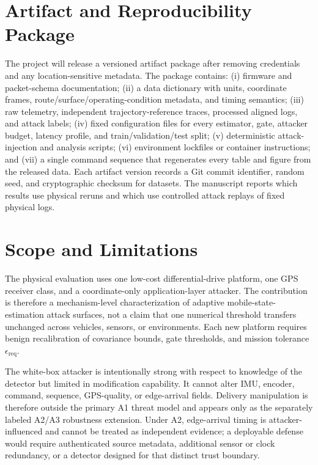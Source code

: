 \documentclass[11pt,a4paper]{article}
\begin{document}
\section{Artifact and Reproducibility Package}
The project will release a versioned artifact package after removing credentials and any location-sensitive metadata. The package contains: (i) firmware and packet-schema documentation; (ii) a data dictionary with units, coordinate frames, route/surface/operating-condition metadata, and timing semantics; (iii) raw telemetry, independent trajectory-reference traces, processed aligned logs, and attack labels; (iv) fixed configuration files for every estimator, gate, attacker budget, latency profile, and train/validation/test split; (v) deterministic attack-injection and analysis scripts; (vi) environment lockfiles or container instructions; and (vii) a single command sequence that regenerates every table and figure from the released data. Each artifact version records a Git commit identifier, random seed, and cryptographic checksum for datasets. The manuscript reports which results use physical reruns and which use controlled attack replays of fixed physical logs.

\section{Scope and Limitations}
The physical evaluation uses one low-cost differential-drive platform, one GPS receiver class, and a coordinate-only application-layer attacker. The contribution is therefore a mechanism-level characterization of adaptive mobile-state-estimation attack surfaces, not a claim that one numerical threshold transfers unchanged across vehicles, sensors, or environments. Each new platform requires benign recalibration of covariance bounds, gate thresholds, and mission tolerance $\epsilon_{\mathrm{req}}$.

The white-box attacker is intentionally strong with respect to knowledge of the detector but limited in modification capability. It cannot alter IMU, encoder, command, sequence, GPS-quality, or edge-arrival fields. Delivery manipulation is therefore outside the primary A1 threat model and appears only as the separately labeled A2/A3 robustness extension. Under A2, edge-arrival timing is attacker-influenced and cannot be treated as independent evidence; a deployable defense would require authenticated source metadata, additional sensor or clock redundancy, or a detector designed for that distinct trust boundary.
\end{document}
